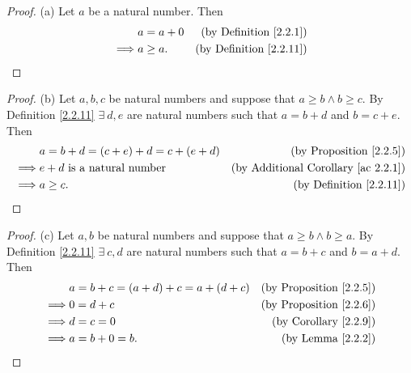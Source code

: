 \begin{proof}{(a)}
    Let \(a\) be a natural number.
    Then
    \begin{align*}
                 & a = a + 0 & \text{(by Definition \ref{2.2.1})}  \\
        \implies & a \geq a. & \text{(by Definition \ref{2.2.11})}
    \end{align*}
\end{proof}

\begin{proof}{(b)}
    Let \(a, b, c\) be natural numbers and suppose that \(a \geq b \land b \geq c\).
    By Definition \ref{2.2.11} \(\exists\ d, e\) are natural numbers such that \(a = b + d\) and \(b = c + e\).
    Then
    \begin{align*}
                 & a = b + d = (c + e) + d = c + (e + d) & \text{(by Proposition \ref{2.2.5})}             \\
        \implies & e + d \text{ is a natural number}     & \text{(by Additional Corollary \ref{ac 2.2.1})} \\
        \implies & a \geq c.                             & \text{(by Definition \ref{2.2.11})}             \\
    \end{align*}
\end{proof}

\begin{proof}{(c)}
    Let \(a, b\) be natural numbers and suppose that \(a \geq b \land b \geq a\).
    By Definition \ref{2.2.11} \(\exists\ c, d\) are natural numbers such that \(a = b + c\) and \(b = a + d\).
    Then
    \begin{align*}
                 & a = b + c = (a + d) + c = a + (d + c) & \text{(by Proposition \ref{2.2.5})} \\
        \implies & 0 = d + c                             & \text{(by Proposition \ref{2.2.6})} \\
        \implies & d = c = 0                             & \text{(by Corollary \ref{2.2.9})}   \\
        \implies & a = b + 0 = b.                        & \text{(by Lemma \ref{2.2.2})}
    \end{align*}
\end{proof}

